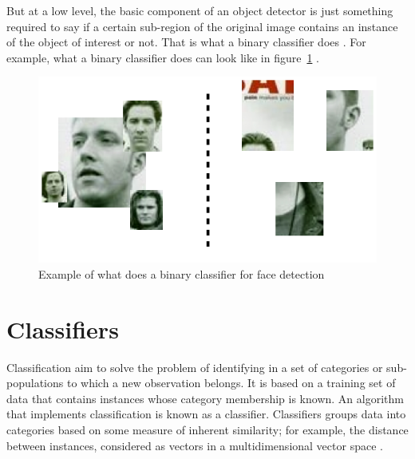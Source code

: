 \noindent But at a low level, the basic component of an object detector is just something required to say if a certain sub-region of the original image contains an instance of the object of interest or not. That is what a binary classifier does \cite{DIN08}. For example, what a binary classifier does can look like in figure~\ref{output_example_face_detection_binary_classifier} \cite{DIN08}.
\newline

\begin{figure}[!h]
\begin{center}
\noindent \includegraphics[scale=0.5]{figures/output_example_face_detection_binary_classifier} 
\newline
\caption{Example of what does a binary classifier for face detection}
\label{output_example_face_detection_binary_classifier}
\end{center} 
\end{figure}

\section{Classifiers}

\vspace{\baselineskip}
\noindent Classification aim to solve the problem of identifying in a set of categories or sub-populations to which a new observation belongs. It is based on a training set of data that contains instances whose category membership is known. An algorithm that implements classification is known as a classifier. Classifiers groups data into categories based on some measure of inherent similarity; for example, the distance between instances, considered as vectors in a multidimensional vector space \cite{CLASS}.
\newline









